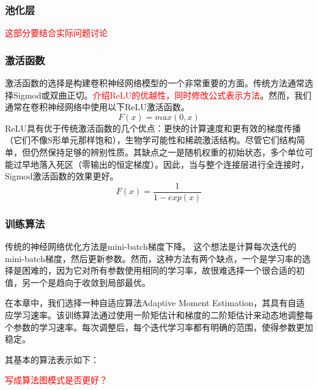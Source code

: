 \subsubsection{池化层}

\textcolor{red}{这部分要结合实际问题讨论}

\subsubsection{激活函数}
激活函数的选择是构建卷积神经网络模型的一个非常重要的方面。传统方法通常选择Sigmod或双曲正切。\textcolor{red}{介绍ReLU的优越性，同时修改公式表示方法}。然而，我们通常在卷积神经网络中使用以下ReLU激活函数。
\begin{equation}
F(x) = max (0, x)
\end{equation}
ReLU具有优于传统激活函数的几个优点：更快的计算速度和更有效的梯度传播（它们不像S形单元那样饱和），生物学可能性和稀疏激活结构。尽管它们结构简单，但仍然保持足够的辨别性质。其缺点之一是随机权重的初始状态，多个单位可能过早地落入死区（零输出的恒定梯度）。因此，当与整个连接层进行全连接时，Sigmod激活函数的效果更好。
\begin{equation}
F(x) = \frac{1}{1-exp(x)}
\end{equation}

\subsubsection{训练算法}
传统的神经网络优化方法是mini-batch梯度下降。 这个想法是计算每次迭代的mini-batch梯度，然后更新参数。然而，这种方法有两个缺点，一个是学习率的选择是困难的，因为它对所有参数使用相同的学习率，故很难选择一个很合适的初值，另一个是趋向于收敛到局部最优。

在本章中，我们选择一种自适应算法Adaptive Moment Estimation，其具有自适应学习速率。该训练算法通过使用一阶矩估计和梯度的二阶矩估计来动态地调整每个参数的学习速率。每次调整后，每个迭代学习率都有明确的范围，使得参数更加稳定。

其基本的算法表示如下：

\textcolor{red}{写成算法图模式是否更好？}

